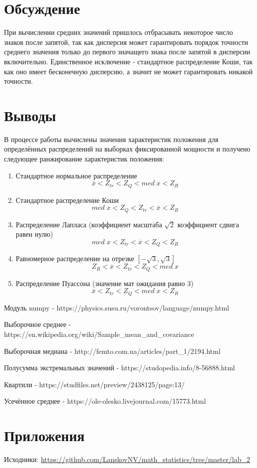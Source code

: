\documentclass[12pt]{article}
\begin{document}
\section{Обсуждение}

\par При вычислении средних значений пришлось отбрасывать некоторое число знаков после запятой, так как дисперсия может гарантировать порядок точности среднего значения только до первого значащего знака после запятой в дисперсии включительно. Единственное исключение - стандартное распределение Коши, так как оно имеет бесконечную дисперсию, а значит не может гарантировать никакой точности.

\section{Выводы}

\par В процессе работы вычислены значения характеристик положения для определённых распределений на выборках фиксированной мощности и получено следующее ранжирование характеристик положения:

\begin{enumerate}
    \item Стандартное нормальное распределение $$\overline{x} < Z_{tr} < Z_Q < med\;x < Z_R$$
    
    \item Стандартное распределение Коши $$med\;x < Z_Q < Z_{tr} < \overline{x} < Z_R$$
    
    \item Распределение Лапласа (коэффициент масштаба $\sqrt{2}$ коэффициент сдвига равен нулю) $$med\;x < Z_{tr} < \overline{x} < Z_Q < Z_R$$
    
    \item Равномерное распределение на отрезке $\left[-\sqrt{3},\sqrt{3}\right]$ $$Z_R < \overline{x} < Z_{tr} < Z_Q < med\;x$$
    
    \item Распределение Пуассона (значение мат ожидания равно $3$) $$\overline{x} < Z_{tr} < Z_Q < med\;x < Z_R$$
    
\end{enumerate}

\begin{thebibliography}{}
      Модуль numpy  -  https://physics.susu.ru/vorontsov/language/numpy.html
    
    Выборочное среднее  -  https://en.wikipedia.org/wiki/Sample\_mean\_and\_covariance
    
    Выборочная медиана  -  http://femto.com.ua/articles/part\_1/2194.html
    
    Полусумма экстремальных значений  -  https://studopedia.info/8-56888.html
    
    Квартили  -  https://studfiles.net/preview/2438125/page:13/
    
      Усечённое среднее  -  https://ole-olesko.livejournal.com/15773.html
\end{thebibliography}

\section{Приложения}

Исходники: \url{https://github.com/LanskovNV/math_statistics/tree/master/lab_2}
\end{document}
